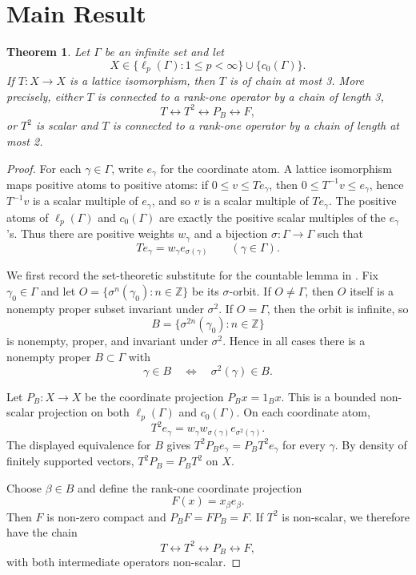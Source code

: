 \documentclass[11pt]{article}
\newtheorem{theorem}{Theorem}
\newcommand{\Z}{\mathbb{Z}}
\begin{document}
\section*{Main Result}

\begin{theorem}
Let $\Gamma$ be an infinite set and let
\[
X\in \{\ell_p(\Gamma):1\le p<\infty\}\cup \{c_0(\Gamma)\}.
\]
If $T:X\to X$ is a lattice isomorphism, then $T$ is of chain at most 3.  More
precisely, either $T$ is connected to a rank-one operator by a chain of length
3,
\[
T\leftrightarrow T^2\leftrightarrow P_B\leftrightarrow F,
\]
or $T^2$ is scalar and $T$ is connected to a rank-one operator by a chain of
length at most 2.
\end{theorem}

\begin{proof}
For each $\gamma\in\Gamma$, write $e_\gamma$ for the coordinate atom.  A
lattice isomorphism maps positive atoms to positive atoms: if $0\le v\le
Te_\gamma$, then $0\le T^{-1}v\le e_\gamma$, hence $T^{-1}v$ is a scalar
multiple of $e_\gamma$, and so $v$ is a scalar multiple of $Te_\gamma$.
The positive atoms of $\ell_p(\Gamma)$ and $c_0(\Gamma)$ are exactly the
positive scalar multiples of the $e_\gamma$'s.  Thus there are positive weights
$w_\gamma$ and a bijection $\sigma:\Gamma\to\Gamma$ such that
\[
Te_\gamma=w_\gamma e_{\sigma(\gamma)} \qquad(\gamma\in\Gamma).
\]

We first record the set-theoretic substitute for the countable lemma in
\cite{Szczepanski2025}.  Fix $\gamma_0\in\Gamma$ and let
$O=\{\sigma^n(\gamma_0): n\in\Z\}$ be its $\sigma$-orbit.  If $O\ne\Gamma$,
then $O$ itself is a nonempty proper subset invariant under $\sigma^2$.  If
$O=\Gamma$, then the orbit is infinite, so
\[
B=\{\sigma^{2n}(\gamma_0): n\in\Z\}
\]
is nonempty, proper, and invariant under $\sigma^2$.  Hence in all cases there
is a nonempty proper $B\subset\Gamma$ with
\[
\gamma\in B \quad\Longleftrightarrow\quad \sigma^2(\gamma)\in B.
\]

Let $P_B:X\to X$ be the coordinate projection $P_Bx=1_Bx$.  This is a bounded
non-scalar projection on both $\ell_p(\Gamma)$ and $c_0(\Gamma)$.  On each
coordinate atom,
\[
T^2e_\gamma=w_\gamma w_{\sigma(\gamma)}e_{\sigma^2(\gamma)}.
\]
The displayed equivalence for $B$ gives $T^2P_Be_\gamma=P_BT^2e_\gamma$ for
every $\gamma$.  By density of finitely supported vectors, $T^2P_B=P_BT^2$ on
$X$.

Choose $\beta\in B$ and define the rank-one coordinate projection
\[
F(x)=x_\beta e_\beta .
\]
Then $F$ is non-zero compact and $P_BF=FP_B=F$.  If $T^2$ is non-scalar, we
therefore have the chain
\[
T\leftrightarrow T^2\leftrightarrow P_B\leftrightarrow F,
\]
with both intermediate operators non-scalar.


\end{proof}
\end{document}
